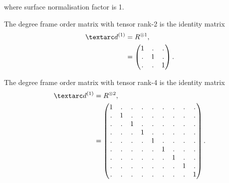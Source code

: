 where surface normalisation factor is 1.



The  degree frame order matrix with tensor rank-2 is the identity matrix
\begin{subequations} \label{eq: rigid 1st degree frame order matrix}
\begin{align}
    \FOone &= R^{\otimes 1} , \\
           &= \begin{pmatrix}
                  1 & . & . \\
                  . & 1 & . \\
                  . & . & 1 \\
              \end{pmatrix}.
\end{align}
\end{subequations}



The  degree frame order matrix with tensor rank-4 is the identity matrix
\begin{subequations} \label{eq: rigid 2nd degree frame order matrix}
\begin{align}
    \FOone &= R^{\otimes 2} , \\
           &= \begin{pmatrix}
                  1 & . & . & . & . & . & . & . & . \\
                  . & 1 & . & . & . & . & . & . & . \\
                  . & . & 1 & . & . & . & . & . & . \\
                  . & . & . & 1 & . & . & . & . & . \\
                  . & . & . & . & 1 & . & . & . & . \\
                  . & . & . & . & . & 1 & . & . & . \\
                  . & . & . & . & . & . & 1 & . & . \\
                  . & . & . & . & . & . & . & 1 & . \\
                  . & . & . & . & . & . & . & . & 1 \\
              \end{pmatrix}.
\end{align}
\end{subequations}



